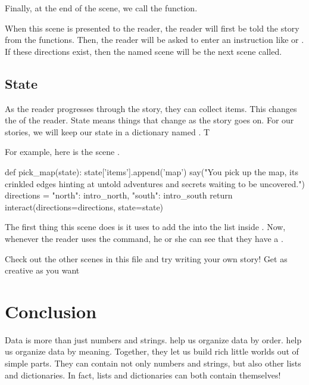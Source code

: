 Finally, at the end of the scene, we call the  function.

When this scene is presented to the reader, the reader will first be told the story from the 
functions. Then, the reader will be asked to enter an instruction like  or
. If these directions exist, then the named scene will be the next scene
called.

\subsection{State}

As the reader progresses through the story, they can collect items. This changes the  of
the reader. State means things that change as the story goes on. For our stories, we will keep our
state in a dictionary named . T

For example, here is the scene .

\begin{replbox}
def pick_map(state):
    state['items'].append('map')
    say("You pick up the map, its crinkled edges hinting at untold adventures and secrets waiting to be uncovered.")
    directions = {
        "north": intro_north,
        "south": intro_south
    }
    return interact(directions=directions, state=state)
\end{replbox}

The first thing this scene does is it uses  to add the  into the list
inside . Now, whenever the reader uses the  command, he or she can see that they have a .

\begin{TryThisBox}
  Check out the other scenes in this file and try writing your own story! Get as creative as you want
\end{TryThisBox}

\section{Conclusion}

Data is more than just numbers and strings.  help us organize data by
order.  help us organize data by meaning. Together, they let us build rich little
worlds out of simple parts.  They can contain not only numbers and strings, but also other lists and
dictionaries. In fact, lists and dictionaries can both contain themselves!

